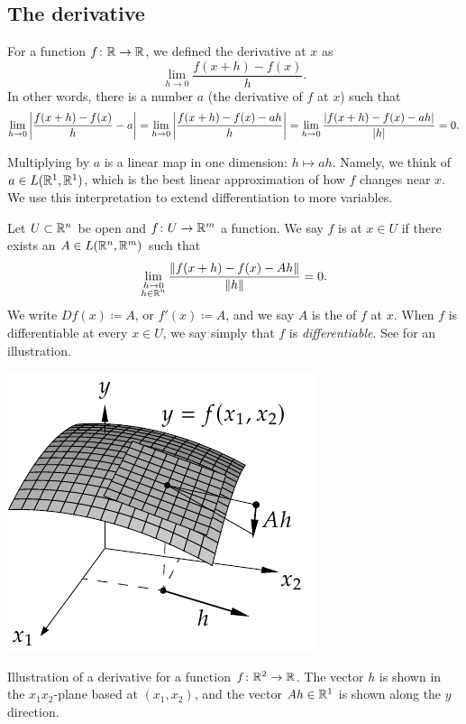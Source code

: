 
\subsection{The derivative}

For a function $f \colon {\mathbb{R}} \to {\mathbb{R}}$, we defined
the derivative at $x$ as
\begin{equation*}
\lim_{h \to 0} \frac{f(x+h)-f(x)}{h} .
\end{equation*}
In other words, there is a number $a$ (the derivative of $f$ at $x$) such that
\begin{equation*}
\lim_{h \to 0} \left\lvert {\frac{f(x+h)-f(x)}{h} - a} \right\rvert
=
\lim_{h \to 0} \left\lvert {\frac{f(x+h)-f(x) - ah}{h}} \right\rvert
=
\lim_{h \to 0} \frac{\lvert {f(x+h)-f(x) - ah} \rvert}{\lvert {h} \rvert}
= 0.
\end{equation*}

Multiplying by $a$ is a linear map in one dimension:
$h \mapsto ah$.
Namely,
we think of $a \in L({\mathbb{R}}^1,{\mathbb{R}}^1)$, 
which is the best linear approximation of
how $f$ changes near $x$.  We use this interpretation
to extend differentiation to more variables.

\begin{defn}
Let $U \subset {\mathbb{R}}^n$ be open and $f \colon U \to {\mathbb{R}}^m$ a function.  We
say $f$ is \emph{} at $x \in U$ if there exists
an $A \in L({\mathbb{R}}^n,{\mathbb{R}}^m)$ such that
\begin{equation*}
\lim_{\substack{h \to 0\\h\in {\mathbb{R}}^n}}
\frac{\lVert {f(x+h)-f(x) - Ah} \rVert}{\lVert {h} \rVert} = 0 .
\end{equation*}
We write $Df(x) \coloneqq A$, or $f'(x) \coloneqq A$, and
we say $A$ is the \emph{} of $f$ at $x$.
When $f$ is differentiable at
every $x \in U$, we say simply that $f$ is \emph{differentiable}.  See
 for an illustration.
\end{defn}

\begin{myfigureht}
\includegraphics{figures/svder}
\caption{Illustration of a derivative for a function $f \colon {\mathbb{R}}^2 \to {\mathbb{R}}$.  The vector $h$ is shown
in the $x_1x_2$-plane based at $(x_1,x_2)$, and the vector
$Ah \in {\mathbb{R}}^1$ is shown along the $y$ direction.\label{fig:svder}}
\end{myfigureht}

